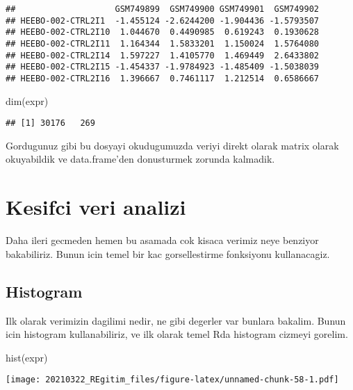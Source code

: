 \documentclass[
]{book}
\newenvironment{Shaded}{\begin{snugshade}}{\end{snugshade}}
\newcommand{\FunctionTok}[1]{\textcolor[rgb]{0.00,0.00,0.00}{#1}}
\newcommand{\NormalTok}[1]{#1}
\begin{document}
\begin{verbatim}
##                    GSM749899  GSM749900 GSM749901  GSM749902
## HEEBO-002-CTRL2I1  -1.455124 -2.6244200 -1.904436 -1.5793507
## HEEBO-002-CTRL2I10  1.044670  0.4490985  0.619243  0.1930628
## HEEBO-002-CTRL2I11  1.164344  1.5833201  1.150024  1.5764080
## HEEBO-002-CTRL2I14  1.597227  1.4105770  1.469449  2.6433802
## HEEBO-002-CTRL2I15 -1.454337 -1.9784923 -1.485409 -1.5038039
## HEEBO-002-CTRL2I16  1.396667  0.7461117  1.212514  0.6586667
\end{verbatim}

\begin{Shaded}
\begin{Highlighting}[]
\FunctionTok{dim}\NormalTok{(expr)}
\end{Highlighting}
\end{Shaded}

\begin{verbatim}
## [1] 30176   269
\end{verbatim}

Gordugunuz gibi bu dosyayi okudugumuzda veriyi direkt olarak matrix olarak okuyabildik ve data.frame'den donusturmek zorunda kalmadik.

\hypertarget{kesifci-veri-analizi}{%
\section{Kesifci veri analizi}\label{kesifci-veri-analizi}}

Daha ileri gecmeden hemen bu asamada cok kisaca verimiz neye benziyor bakabiliriz. Bunun icin temel bir kac gorsellestirme fonksiyonu kullanacagiz.

\hypertarget{histogram}{%
\subsection{Histogram}\label{histogram}}

Ilk olarak verimizin dagilimi nedir, ne gibi degerler var bunlara bakalim. Bunun icin histogram kullanabiliriz, ve ilk olarak temel Rda histogram cizmeyi gorelim.

\begin{Shaded}
\begin{Highlighting}[]
\FunctionTok{hist}\NormalTok{(expr)}
\end{Highlighting}
\end{Shaded}

\texttt{[image: 20210322\_REgitim\_files/figure-latex/unnamed-chunk-58-1.pdf]}
\end{document}
